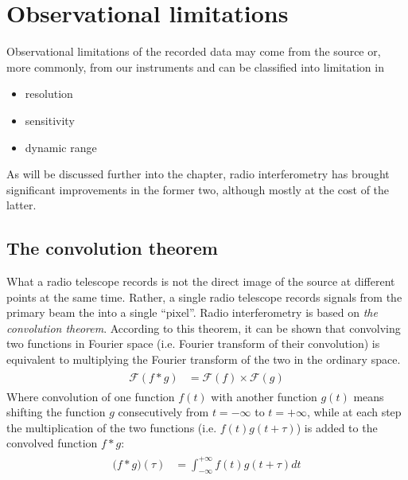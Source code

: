 \documentclass[a4wide,12pt]{book}
\begin{document}
\section{Observational limitations}
Observational limitations of the recorded data may come from the source or, more commonly, from our instruments and can be classified into limitation in 
\begin{itemize}
\item resolution
\item sensitivity
\item dynamic range
\end{itemize}
As will be discussed further into the chapter, radio interferometry has brought significant improvements in the former two, although mostly at the cost of the latter.

\subsection*{The convolution theorem}
What a radio telescope records is not the direct image of the source at different points at the same time. Rather, a single radio telescope records signals from the primary beam the into a single ``pixel''.  Radio interferometry is based on \emph{the convolution theorem}. According to this theorem, it can be shown that convolving two functions in Fourier space (i.e. Fourier transform of their convolution) is equivalent to multiplying the Fourier transform of the two in the ordinary space.
\begin{align} 
\begin{split}
\mathcal{F}(f*g) &= \mathcal{F}(f) \times \mathcal{F}(g)
\end{split}                    
\end{align}
Where convolution of one function $f(t)$ with another function $g(t)$ means shifting the function $g$ consecutively from $t=-\infty$ to $t=+\infty$, while at each step the multiplication of the two functions (i.e. $f(t)g(t+\tau)$) is added to the convolved function $f*g$:
\begin{align} 
\begin{split}
\mathcal (f*g)(\tau) &= \int_{-\infty}^{+\infty} f(t)g(t+\tau) dt
\end{split}                    
\end{align}
\end{document}
